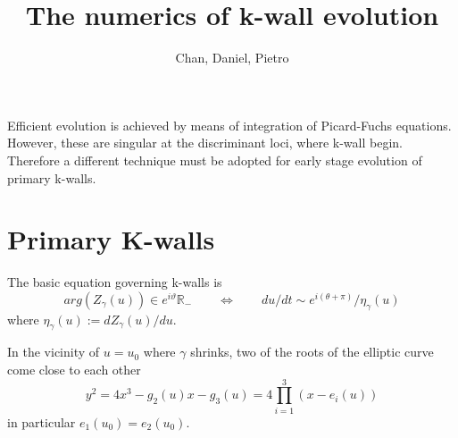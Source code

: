 \documentclass[11pt]{article}
\title{	The numerics of k-wall evolution}
\author{Chan, Daniel, Pietro}
\newcommand{\be}{\begin{equation}}
\newcommand{\ee}{\end{equation}}
\newcommand{\IR}{\mathbb{R}}
\begin{document}
\maketitle
\tableofcontents

Efficient evolution is achieved by means of integration of Picard-Fuchs equations.
However, these are singular at the discriminant loci, where k-wall begin. Therefore a different technique must be adopted for early stage evolution of primary k-walls.

\section{Primary K-walls}
The basic equation governing k-walls is
\be
	arg(Z_{\gamma}(u)) \in e^{i\vartheta}\IR_{-} \qquad \Leftrightarrow \qquad du/dt \sim e^{i(\theta +\pi)} / \eta_{\gamma}(u)
\ee
where $\eta_{\gamma}(u):=dZ_{\gamma}(u) / du$.

In the vicinity of $u=u_{0}$ where $\gamma$ shrinks, two of the roots of the elliptic curve come close to each other
\be
	y^{2} = 4 x^{3} - g_{2}(u) x -g_{3}(u) = 4\prod_{i=1}^{3}(x-e_{i}(u))
\ee
in particular $e_{1}(u_{0})= e_{2}(u_{0})$.
\end{document}
